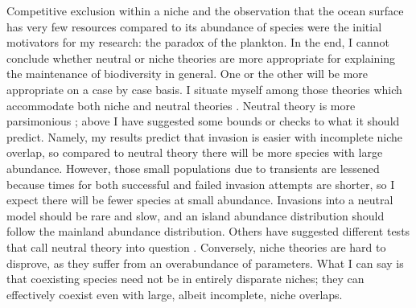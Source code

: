 Competitive exclusion within a niche and the observation that the ocean surface has very few resources compared to its abundance of species were the initial motivators for my research: the paradox of the plankton. 
In the end, I cannot conclude whether neutral or niche theories are more appropriate for explaining the maintenance of biodiversity in general. 
One or the other will be more appropriate on a case by case basis. 
I situate myself among those theories which accommodate both niche and neutral theories \cite{Leibold2006,Ofiteru2010,Pigolotti2013,Fisher2014,Kessler2015}. 
Neutral theory is more parsimonious \cite{Leibold2006}; above I have suggested some bounds or checks to what it should predict. 
Namely, my results predict that invasion is easier with incomplete niche overlap, so compared to neutral theory there will be more species with large abundance. 
However, those small populations due to transients are lessened because times for both successful and failed invasion attempts are shorter, so I expect there will be fewer species at small abundance. 
Invasions into a neutral model should be rare and slow, and an island abundance distribution should follow the mainland abundance distribution. %
Others have suggested different tests that call neutral theory into question \cite{McGill2003,Ricklefs2006,Kelly2008,Adler2010,Rosindell2011,Carroll2015}. 
Conversely, niche theories are hard to disprove, as they suffer from an overabundance of parameters. 
What I can say is that coexisting species need not be in entirely disparate niches; they can effectively coexist even with large, albeit incomplete, niche overlaps. 



